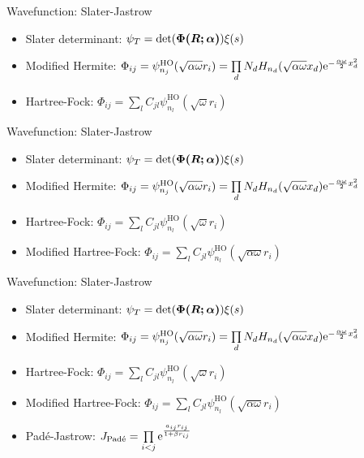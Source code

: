 \documentclass[10pt, t, xcolor=dvipsnames]{beamer}
\begin{document}
\begin{frame}[fragile]{Wavefunction: Slater-Jastrow}
    \begin{itemize}
        \item Slater determinant: $\psi_T =
            \det(\bm{{\Phi(\bm{{R}};\bm{{\alpha}})}}) \xi(s)$
        \item Modified Hermite: $\Phi_{ij} =
            \psi^{\text{HO}}_{n_j}(\sqrt{\alpha\omega}r_i) = \prod\limits_d N_d
            H_{n_d}(\sqrt{\alpha \omega}x_d)\mathrm{e}^{-\frac{\alpha\omega}{2}x^2_d}$
        \item Hartree-Fock: $\Phi_{ij} =
            \sum\limits_lC_{jl}\psi^{\text{HO}}_{n_l}\left(\sqrt{\omega}r_i\right)$
    \end{itemize}
\end{frame}

\begin{frame}[fragile]{Wavefunction: Slater-Jastrow}
    \begin{itemize}
        \item Slater determinant: $\psi_T =
            \det(\bm{{\Phi(\bm{{R}};\bm{{\alpha}})}}) \xi(s)$
        \item Modified Hermite: $\Phi_{ij} =
            \psi^{\text{HO}}_{n_j}(\sqrt{\alpha\omega}r_i) = \prod\limits_d N_d
            H_{n_d}(\sqrt{\alpha \omega}x_d)\mathrm{e}^{-\frac{\alpha\omega}{2}x^2_d}$
        \item Hartree-Fock: $\Phi_{ij} =
            \sum\limits_lC_{jl}\psi^{\text{HO}}_{n_l}\left(\sqrt{\omega}r_i\right)$
        \item Modified Hartree-Fock: $\Phi_{ij} =
            \sum\limits_lC_{jl}\psi^{\text{HO}}_{n_l}\left(\sqrt{\alpha\omega}r_i\right)$
    \end{itemize}
\end{frame}

\begin{frame}[fragile]{Wavefunction: Slater-Jastrow}
    \begin{itemize}
        \item Slater determinant: $\psi_T =
            \det(\bm{{\Phi(\bm{{R}};\bm{{\alpha}})}}) \xi(s)$
        \item Modified Hermite: $\Phi_{ij} =
            \psi^{\text{HO}}_{n_j}(\sqrt{\alpha\omega}r_i) = \prod\limits_d N_d
            H_{n_d}(\sqrt{\alpha \omega}x_d)\mathrm{e}^{-\frac{\alpha\omega}{2}x^2_d}$
        \item Hartree-Fock: $\Phi_{ij} =
            \sum\limits_lC_{jl}\psi^{\text{HO}}_{n_l}\left(\sqrt{\omega}r_i\right)$
        \item Modified Hartree-Fock: $\Phi_{ij} =
            \sum\limits_lC_{jl}\psi^{\text{HO}}_{n_l}\left(\sqrt{\alpha\omega}r_i\right)$
        \item Pad\'e-Jastrow: $J_{\text{Pad\'e}} = \prod\limits_{i<j}
            \mathrm{e}^{\frac{a_{ij} r_{ij}}{1 + \beta r_{ij}}}$
    \end{itemize}
\end{frame}
\end{document}
